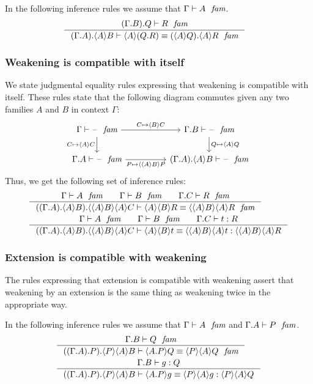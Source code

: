 In the following inference rules we assume that $\jfam{\Gamma}{A}$.
\begin{align}
& \inference
  {\jfam{\ctxext{{\Gamma}{B}}{Q}}{R}}
  {\jfameq
    {\ctxext{{\Gamma}{A}}{\ctxwk{A}{B}}}
    {\ctxwk{A}{\ctxext{Q}{R}}}
    {\ctxext{\ctxwk{A}{Q}}{\ctxwk{A}{R}}}}
\end{align}

\subsubsection{Weakening is compatible with itself}\label{comp-ww}
We state judgmental equality rules expressing
that weakening is compatible with itself. These rules state that the following
diagram commutes given any two families $A$ and $B$ in context $\Gamma$:
\begin{equation*}
\begin{tikzcd}[column sep=huge]
\jfam{\Gamma}{\blank} \ar{r}{C\mapsto\ctxwk{B}{C}} \ar{d}[swap]{C\mapsto\ctxwk{A}{C}} & \jfam{\ctxext{\Gamma}{B}}{\blank} \ar{d}{Q\mapsto\ctxwk{A}{Q}}\\
\jfam{\ctxext{\Gamma}{A}}{\blank} \ar{r}[swap]{P\mapsto\ctxwk{{A}{B}}{P}} & \jfam{\ctxext{{\Gamma}{A}}{\ctxwk{A}{B}}}{\blank}
\end{tikzcd}
\end{equation*}
Thus, we get the following set of inference rules:
\begin{align}
& \inference{\jfam{\Gamma}{A}\qquad\jfam{\Gamma}{B}\qquad\jfam{\ctxext{\Gamma}{C}}{R}}
          {\jfameq{\ctxext{{{\Gamma}{A}}{\ctxwk{A}{B}}}{\ctxwk{{A}{B}}{{A}{C}}}}
            {\ctxwk{A}{{B}{R}}}
            {\ctxwk{{A}{B}}{{A}{R}}}}\label{comp-ww-f}\\
& \inference{\jfam{\Gamma}{A}\qquad\jfam{\Gamma}{B}\qquad\jterm{\ctxext{\Gamma}{C}}{R}{t}}
          {\jtermeq{\ctxext{{{\Gamma}{A}}{\ctxwk{A}{B}}}{\ctxwk{{A}{B}}{{A}{C}}}}
            {\ctxwk{{A}{B}}{{A}{R}}}{\ctxwk{A}{{B}{t}}}{\ctxwk{{A}{B}}{{A}{t}}}}
            \label{comp-ww-t}
\end{align}

\subsubsection{Extension is compatible with weakening}\label{comp-ew}
The rules expressing that extension is compatible with weakening assert that
weakening by an extension is the same thing as weakening twice in the
appropriate way.

In the following inference rules we assume that
$\jfam{\Gamma}{A}$ and $\jfam{\ctxext{\Gamma}{A}}{P}$. 
\begin{align}
& \inference{\jfam{\ctxext{\Gamma}{B}}{Q}}
    {\jfameq{\ctxext{{{\Gamma}{A}}{P}}{\ctxwk{P}{{A}{B}}}}{\ctxwk{\ctxext{A}{P}}{Q}}{\ctxwk{P}{{A}{Q}}}}\label{comp-ew-f}\\
& \inference{\jterm{\ctxext{\Gamma}{B}}{Q}{g}}
    {\jtermeq{\ctxext{{{\Gamma}{A}}{P}}{\ctxwk{P}{{A}{B}}}}{\ctxwk{P}{{A}{Q}}}{\ctxwk{\ctxext{A}{P}}{g}}{\ctxwk{P}{{A}{g}}}}\label{comp-ew-t}
\end{align}

